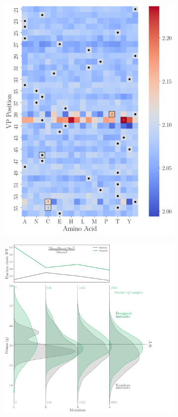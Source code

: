 \documentclass{article}
\begin{document}
\begin{figure}[htbp]
  \centering
  \begin{subfigure}[b]{.41\linewidth}
    \centering
    \includegraphics[width=\linewidth]{figures/random_vs_designed_heatmap.png}
    \caption{}
  \end{subfigure}
  \hfill
  \begin{subfigure}[b]{.57\linewidth}
    \centering
    \includegraphics[width=\linewidth]{figures/random_vs_designed_oracle.png}

\end{subfigure}
\end{figure}
\end{document}

